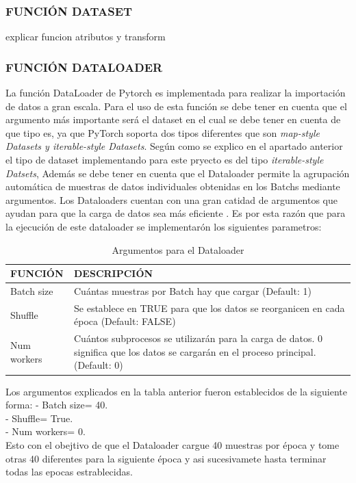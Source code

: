 			\subsubsection{\MakeUppercase{Función Dataset}}
			explicar funcion atributos y transform
			
			\newpage
			\subsubsection{\MakeUppercase{Función Dataloader}}
			La función DataLoader de Pytorch es implementada para realizar la importación de datos a gran escala. Para el uso de esta función se debe tener en cuenta que el argumento más importante será el dataset en el cual se debe tener en cuenta de que tipo es, ya que PyTorch soporta dos tipos diferentes que son \textit{map-style Datasets y iterable-style Datasets}. 
			Según como se explico en el apartado anterior el tipo de dataset implementando para este pryecto es del tipo \textit{iterable-style Datsets}, Además se debe tener en cuenta que el Dataloader permite la agrupación automática de muestras de datos individuales obtenidas en los Batchs mediante argumentos. 
			Los Dataloaders cuentan con una gran catidad de argumentos que ayudan para que la carga de datos sea más eficiente \cite{Pytorch}. Es por esta razón que para la ejecución de este dataloader se implementarón los siguientes parametros:
			
			\begin{table}[ht]
				\centering
				\begin{tabular}{|p{3cm}|p{8cm}|}
					\hline
					FUNCIÓN & DESCRIPCIÓN \\ 
					\hline
					Batch size & Cuántas muestras por Batch hay que cargar (Default: 1)\\
					\hline
					Shuffle & Se establece en TRUE para que los datos se reorganicen en cada época (Default: FALSE)  \\
					\hline
					Num workers & Cuántos subprocesos se utilizarán para la carga de datos. 0 significa que los datos se cargarán en el proceso principal. (Default: 0)\\
					\hline
				\end{tabular}	
				\caption{Argumentos para el Dataloader}
				\label{table:Argumentos}
			\end{table}
		
		Los argumentos explicados en la tabla anterior fueron establecidos de la siguiente forma:
		- Batch size= 40. \\
		- Shuffle= True. \\
		- Num workers= 0. \\
		Esto con el obejtivo de que el Dataloader cargue 40 muestras por época y tome otras 40 diferentes para la siguiente época y asi sucesivamete hasta terminar todas las epocas estrablecidas.  
		
